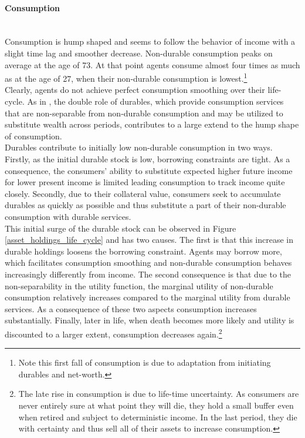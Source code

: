 \documentclass[a4paper,12pt,legno]{article}
\newcommand{\myparagraph}[1]{\paragraph{#1}\mbox{}\\}
\begin{document}
\myparagraph{Consumption} Consumption is hump shaped and seems to follow the behavior of income with a slight time lag and smoother decrease. Non-durable consumption peaks on average at the age of 73. At that point agents consume almost four times as much as at the age of 27, when their non-durable consumption is lowest.\footnote{Note this first fall of consumption is due to adaptation from initiating durables and net-worth.} \\
Clearly, agents do not achieve perfect consumption smoothing over their life-cycle. As in \cite{FV&K2011}, the double role of durables, which provide consumption services that are non-separable from non-durable consumption and may be utilized to substitute wealth across periods, contributes to a large extend to the hump shape of consumption.\\
Durables contribute to initially low non-durable consumption in two ways. Firstly, as the initial durable stock is low, borrowing constraints are tight. As a consequence, the consumers' ability to substitute expected higher future income for lower present income is limited leading consumption to track income quite closely. Secondly, 
due to their collateral value, consumers seek to accumulate durables as quickly as possible and thus substitute a part of their non-durable consumption with durable services. \\
This initial surge of the durable stock can be observed in Figure \ref{asset_holdings_life_cycle} and has two causes. The first is that this increase in durable holdings loosens the borrowing constraint. Agents may borrow more, which facilitates consumption smoothing and non-durable consumption behaves increasingly differently from income. The second consequence is that due to the non-separability in the utility function, the marginal utility of non-durable consumption relatively increases compared to the marginal utility from durable services. As a consequence of these two aspects consumption increases substantially. 
Finally, later in life, when death becomes more likely and utility is discounted to a larger extent, consumption decreases again.\footnote{The late rise in consumption is due to life-time uncertainty. As consumers are never entirely sure at what point they will die, they hold a small buffer even when retired and subject to deterministic income. In the last period, they die with certainty and thus sell all of their assets to increase consumption.} 
\end{document}
